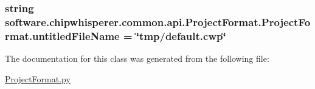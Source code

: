 \subsubsection[{untitled\+File\+Name}]{\setlength{\rightskip}{0pt plus 5cm}string software.\+chipwhisperer.\+common.\+api.\+Project\+Format.\+Project\+Format.\+untitled\+File\+Name = \char`\"{}tmp/default.\+cwp\char`\"{}\hspace{0.3cm}{\ttfamily [static]}}\label{classsoftware_1_1chipwhisperer_1_1common_1_1api_1_1ProjectFormat_1_1ProjectFormat_afc84733fff7c8d94a2466a08f6a4e23c}


The documentation for this class was generated from the following file\+:\begin{DoxyCompactItemize}
\item 
\hyperlink{ProjectFormat_8py}{Project\+Format.\+py}\end{DoxyCompactItemize}

